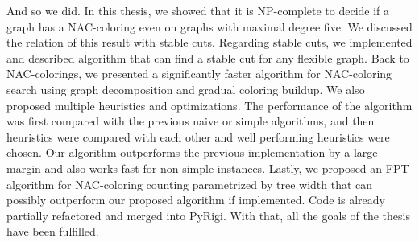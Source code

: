 And so we did.
In this thesis, we showed that it is NP-complete
to decide if a graph has a NAC-coloring even on graphs with maximal degree five.
We discussed the relation of this result with stable cuts.
Regarding stable cuts, we implemented and described algorithm that can find
a stable cut for any flexible graph.
%
Back to NAC-colorings, we presented a significantly faster algorithm
for NAC-coloring search using graph decomposition and gradual coloring buildup.
%
We also proposed multiple heuristics and optimizations.
The performance of the algorithm was
first compared with the previous naive or simple
algorithms, and then heuristics were compared with each other and
well performing heuristics were chosen.
Our algorithm outperforms the previous implementation by a large margin
and also works fast for non-simple instances.
%
Lastly, we proposed an FPT algorithm for NAC-coloring counting
parametrized by tree width that can
possibly outperform our proposed algorithm if implemented.
%
Code is already partially refactored and merged into PyRigi.
%
With that, all the goals of the thesis have been fulfilled.

